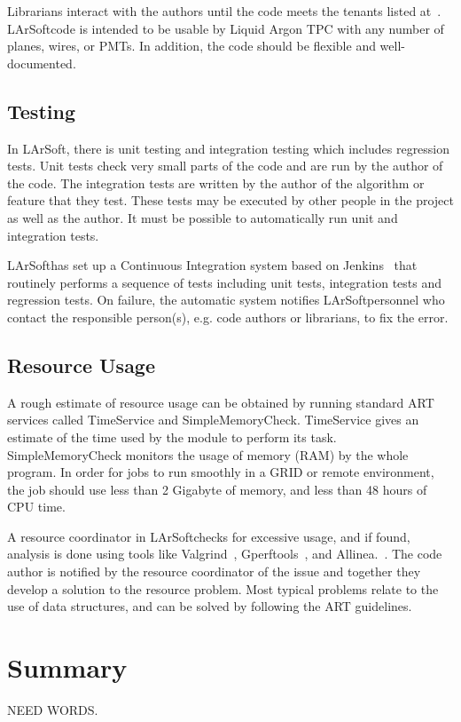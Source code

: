 \documentclass[12pt]{elsarticle}
\newcommand{\larsoft}{LArSoft}
\begin{document}
Librarians interact with the authors until the code meets the tenants listed at~\cite{code-tenants}. \larsoft code is intended to be usable by Liquid Argon TPC with any number of planes, wires, or PMTs. In addition, the code should be flexible and well-documented. 

\subsection{Testing}

In \larsoft, there is unit testing and integration testing which includes regression tests. Unit tests check very small parts of the code and are run by the author of the code. 
The integration tests are written by the author of the algorithm or feature that they test. These tests may be executed by other people in the project as well as the author. It must be possible to automatically run unit and  integration tests.

\larsoft has set up a Continuous Integration system based on Jenkins~\cite{jenkins} that routinely performs a sequence of tests including unit tests, integration tests and regression tests. On failure, the automatic system notifies \larsoft personnel who contact the responsible person(s), e.g. code authors or librarians, to fix the error.

\subsection{Resource Usage}

A rough estimate of resource usage can be obtained by running standard ART services called TimeService and SimpleMemoryCheck. TimeService gives an estimate of the time used by the module to perform its task. SimpleMemoryCheck monitors the usage of memory (RAM) by the whole program. In order for jobs to run smoothly in a GRID or remote environment, the job should use less than 2 Gigabyte of memory, and less than 48 hours of CPU time.

A resource coordinator in \larsoft checks for excessive usage, and if found, analysis is done using tools like Valgrind~\cite{valgrind}, Gperftools~\cite{gperf}, and Allinea.~\cite {allinea}.
The code author is notified by the resource coordinator of the issue and together they develop a solution to the resource problem. Most typical problems relate to the use of data structures, and can be solved by following the ART guidelines.~\cite{art-guide}
 
\section{Summary}
NEED WORDS.
\end{document}

